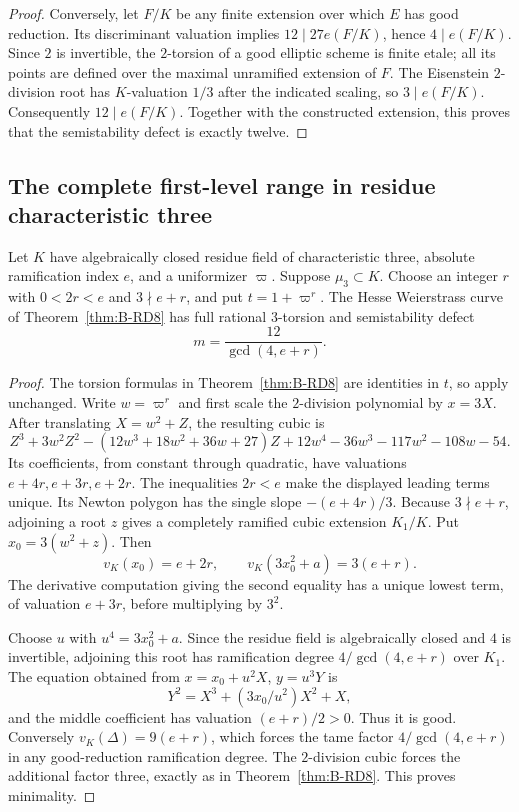 \begin{proof}
Conversely, let $F/K$ be any finite extension over which $E$ has good
reduction. Its discriminant valuation implies
$12\mid27e(F/K)$, hence $4\mid e(F/K)$. Since $2$ is invertible,
the $2$-torsion of a good elliptic scheme is finite etale; all its
points are defined over the maximal unramified extension of $F$.
The Eisenstein $2$-division root has $K$-valuation $1/3$ after the
indicated scaling, so $3\mid e(F/K)$. Consequently
$12\mid e(F/K)$. Together with the constructed extension, this proves
that the semistability defect is exactly twelve.
\end{proof}

\subsection{The complete first-level range in residue characteristic three}

\begin{lemma}\label{lem:B-RD9}
Let $K$ have algebraically closed residue field of characteristic three,
absolute ramification index $e$, and a uniformizer $\varpi$. Suppose
$\mu_3\subset K$. Choose an integer $r$ with
$0<2r<e$ and $3\nmid e+r$, and put $t=1+\varpi^r$. The Hesse
Weierstrass curve of Theorem~\ref{thm:B-RD8} has full rational
$3$-torsion and semistability defect
\[
 m=\frac{12}{\gcd(4,e+r)}.
\]
\end{lemma}
\begin{proof}
The torsion formulas in Theorem~\ref{thm:B-RD8} are identities in $t$,
so apply unchanged. Write $w=\varpi^r$ and first scale the $2$-division
polynomial by $x=3X$. After translating $X=w^2+Z$, the resulting cubic is
\[
 Z^3+3w^2Z^2-(12w^3+18w^2+36w+27)Z
       +12w^4-36w^3-117w^2-108w-54.
\]
Its coefficients, from constant through quadratic, have valuations
$e+4r,e+3r,e+2r$. The inequalities $2r<e$ make the displayed leading
terms unique. Its Newton polygon has the single slope
$-(e+4r)/3$. Because $3\nmid e+r$, adjoining a root $z$ gives a
completely ramified cubic extension $K_1/K$. Put $x_0=3(w^2+z)$.
Then
\[
 v_K(x_0)=e+2r,\qquad v_K(3x_0^2+a)=3(e+r).
\]
The derivative computation giving the second equality has a unique
lowest term, of valuation $e+3r$, before multiplying by $3^2$.

Choose $u$ with $u^4=3x_0^2+a$. Since the residue field is algebraically
closed and $4$ is invertible, adjoining this root has ramification
degree $4/\gcd(4,e+r)$ over $K_1$. The equation obtained from
$x=x_0+u^2X$, $y=u^3Y$ is
\[
 Y^2=X^3+(3x_0/u^2)X^2+X,
\]
and the middle coefficient has valuation $(e+r)/2>0$. Thus it is good.
Conversely $v_K(\Delta)=9(e+r)$, which forces the tame factor
$4/\gcd(4,e+r)$ in any good-reduction ramification degree. The
$2$-division cubic forces the additional factor three, exactly as in
Theorem~\ref{thm:B-RD8}. This proves minimality.
\end{proof}

